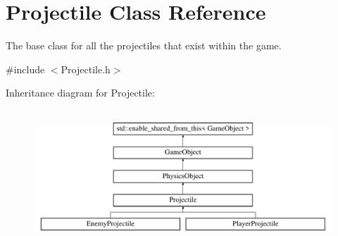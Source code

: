 \hypertarget{class_projectile}{}\section{Projectile Class Reference}
\label{class_projectile}


The base class for all the projectiles that exist within the game.  




{\ttfamily \#include $<$Projectile.\+h$>$}

Inheritance diagram for Projectile\+:\begin{figure}[H]
\begin{center}
\leavevmode
\includegraphics[height=5.000000cm]{db/dbe/class_projectile}
\end{center}
\end{figure}
